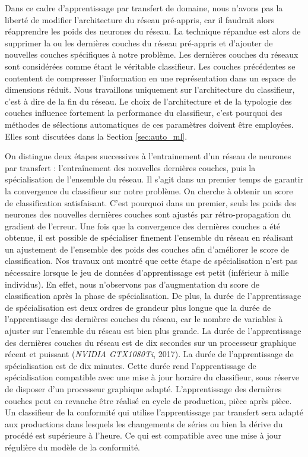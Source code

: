 Dans ce cadre d'apprentissage par transfert de domaine, nous n'avons pas la liberté de modifier l'architecture du réseau pré-appris, car il faudrait alors réapprendre les poids des neurones du réseau.
La technique répandue est alors de supprimer la ou les dernières couches du réseau pré-appris et d'ajouter de nouvelles couches spécifiques à notre problème.
Les dernières couches du réseaux sont considérées comme étant le véritable classifieur.
Les couches précédentes se contentent de compresser l'information en une représentation dans un espace de dimensions réduit.
Nous travaillons uniquement sur l'architecture du classifieur, c'est à dire de la fin du réseau.
Le choix de l'architecture et de la typologie des couches influence fortement la performance du classifieur, c'est pourquoi des méthodes de sélections automatiques de ces paramètres doivent être employées.
Elles sont discutées dans la Section \ref{sec:auto_ml}.

On distingue deux étapes successives à l'entrainement d'un réseau de neurones par transfert : l'entraînement des nouvelles dernières couches, puis la spécialisation de l'ensemble du réseau.
Il s'agit dans un premier temps de garantir la convergence du classifieur sur notre problème.
On cherche à obtenir un score de classification satisfaisant.
C'est pourquoi dans un premier, seuls les poids des neurones des nouvelles dernières couches sont ajustés par rétro-propagation du gradient de l'erreur.
Une fois que la convergence des dernières couches a été obtenue, il est possible de spécialiser finement l'ensemble du réseau en réalisant un ajustement de l'ensemble des poids des couches afin d'améliorer le score de classification.
Nos travaux ont montré que cette étape de spécialisation n'est pas nécessaire lorsque le jeu de données d'apprentissage est petit (inférieur à mille individus).
En effet, nous n'observons pas d'augmentation du score de classification après la phase de spécialisation.
De plus, la durée de l'apprentissage de spécialisation est deux ordres de grandeur plus longue que la durée de l'apprentissage des dernières couches du réseau, car le nombre de variables à ajuster sur l'ensemble du réseau est bien plus grande.
La durée de l'apprentissage des dernières couches du réseau est de dix secondes sur un processeur graphique récent et puissant (\textit{NVIDIA GTX1080Ti}, 2017).
La durée de l'apprentissage de spécialisation est de dix minutes.
Cette durée rend l'apprentissage de spécialisation compatible avec une mise à jour horaire du classifieur, sous réserve de disposer d'un processeur graphique adapté. L'apprentissage des dernières couches peut en revanche être réalisé en cycle de production, pièce après pièce.
Un classifieur de la conformité qui utilise l'apprentissage par transfert sera adapté aux productions dans lesquels les changements de séries ou bien la dérive du procédé est supérieure à l'heure. Ce qui est compatible avec une mise à jour régulière du modèle de la conformité.

